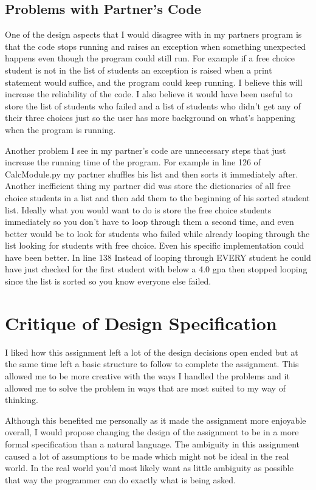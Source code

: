\documentclass[12pt]{article}
\begin{document}
\subsection{Problems with Partner's Code}

One of the design aspects that I would disagree with in my partners program is that the code stops running and raises an exception when something unexpected happens even though the program could still run. For example if a free choice student is not in the list of students an exception is raised when a print statement would suffice, and the program could keep running. I believe this will increase the reliability of the code. I also believe it would have been useful to store the list of students who failed and a list of students who didn't get any of their three choices just so the user has more background on what's happening when the program is running. 

Another problem I see in my partner's code are unnecessary steps that just increase the running time of the program. For example in line 126 of CalcModule.py my partner shuffles his list and then sorts it immediately after. Another inefficient thing my partner did was store the dictionaries of all free choice students in a list and then add them to the beginning of his sorted student list. Ideally what you would want to do is store the free choice students immediately so you don't have to loop through them a second time, and even better would be to look for students who failed while already looping through the list looking for students with free choice. Even his specific implementation could have been better. In line 138 Instead of looping through EVERY student he could have just checked for the first student with below a 4.0 gpa then stopped looping since the list is sorted so you know everyone else failed. 
\section{Critique of Design Specification}

I liked how this assignment left a lot of the design decisions open ended but at the same time left a basic structure to follow to complete the assignment. This allowed me to be more creative with the ways I handled the problems and it allowed me to solve the problem in ways that are most suited to my way of thinking. 

Although this benefited me personally as it made the assignment more enjoyable overall, I would propose changing the design of the assignment to be in a more formal specification than a natural language. The ambiguity in this assignment caused a lot of assumptions to be made which might not be ideal in the real world. In the real world you'd most likely want as little ambiguity as possible that way the programmer can do exactly what is being asked.
\end{document}
